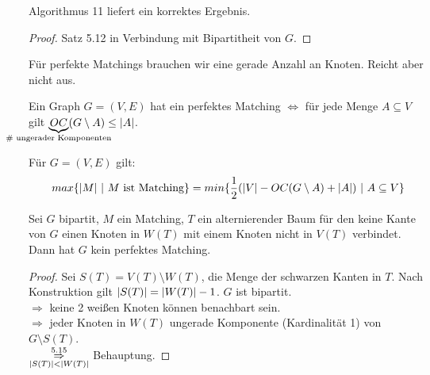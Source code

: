 \begin{satz}
	Algorithmus 11 liefert ein korrektes Ergebnis.
\end{satz}
\begin{proof}
	Satz 5.12 in Verbindung mit Bipartitheit von $G$.
\end{proof}
\begin{beobachtung}
	Für perfekte Matchings brauchen wir eine gerade Anzahl an Knoten. Reicht aber nicht aus.
\end{beobachtung}
\begin{satz}
	Ein Graph $G=(V,E)$ hat ein perfektes Matching $\Leftrightarrow$ für jede Menge $A \subseteq V$ gilt $\underbrace{OC}_{\mathclap{\text{\# ungerader Komponenten}}}(G\setminus A) \le \card{A}$.
\end{satz}
\begin{satz}
	Für $G=(V,E)$ gilt:
	\begin{equation*}
		max\{\vert M \vert~\vert~ M \text{ ist Matching}\} = min\{\frac{1}{2}(\vert V \vert-OC(G\setminus A) + \vert A \vert)~\vert~ A \subseteq V\}
	\end{equation*}
\end{satz}
\begin{satz}
	Sei $G$ bipartit, $M$ ein Matching, $T$ ein alternierender Baum für den keine Kante von $G$ einen Knoten in $W(T)$ mit einem Knoten nicht in $V(T)$ verbindet. Dann hat $G$ kein perfektes Matching.
\end{satz}
\begin{proof}
	Sei $S(T) = V(T)\setminus W(T)$, die Menge der schwarzen Kanten in $T$. Nach Konstruktion gilt $\vert S(T) \vert = \vert W(T) \vert - 1$. $G$ ist bipartit.\\
	$\Rightarrow$ keine 2 weißen Knoten können benachbart sein.\\
	$\Rightarrow$ jeder Knoten in $W(T)$ ungerade Komponente (Kardinalität 1) von $G\setminus S(T)$.\\
	$\underset{\vert S(T) \vert < \vert W(T) \vert}{\overset{5.15}{\Rightarrow}}$ Behauptung.
\end{proof}
